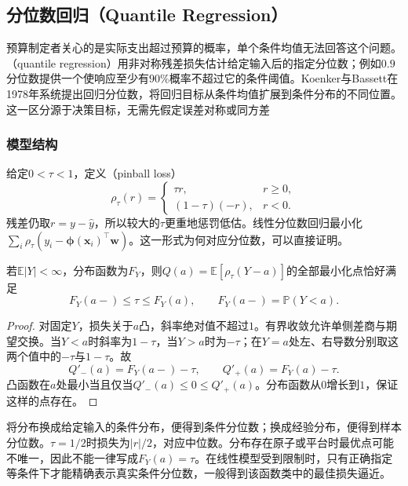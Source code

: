 \subsection{分位数回归（Quantile Regression）}
\label{sec:regression-quantiles}

预算制定者关心的是实际支出超过预算的概率，单个条件均值无法回答这个问题。（quantile regression）用非对称残差损失估计给定输入后的指定分位数；例如$0.9$分位数提供一个使响应至少有$90\%$概率不超过它的条件阈值。Koenker与Bassett在1978年系统提出回归分位数，将回归目标从条件均值扩展到条件分布的不同位置。这一区分源于决策目标，无需先假定误差对称或同方差

\subsubsection{模型结构}

给定$0<\tau<1$，定义（pinball loss）
\begin{equation}
  \rho_\tau(r)=
  \begin{cases}
    \tau r,&r\geq0,\\
    (1-\tau)(-r),&r<0.
  \end{cases}
  \label{eq:regression-pinball}
\end{equation}
残差仍取$r=y-\widehat y$，所以较大的$\tau$更重地惩罚低估。线性分位数回归最小化$\sum_i\rho_\tau(y_i-\bm{\phi}(\bm{x}_i)^{\top}\bm{w})$。这一形式为何对应分位数，可以直接证明。

\begin{theorem}[分位数损失的总体最优解]
  \label{thm:regression-quantile}
  若$\mathbb{E}|Y|<\infty$，分布函数为$F_Y$，则$Q(a)=\mathbb{E}[\rho_\tau(Y-a)]$的全部最小化点恰好满足
  \[
    F_Y(a-)\leq\tau\leq F_Y(a),
    \qquad F_Y(a-)=\mathbb{P}(Y<a).
  \]
\end{theorem}

\begin{proof}
对固定$Y$，损失关于$a$凸，斜率绝对值不超过$1$。有界收敛允许单侧差商与期望交换。当$Y<a$时斜率为$1-\tau$，当$Y>a$时为$-\tau$；在$Y=a$处左、右导数分别取这两个值中的$-\tau$与$1-\tau$。故
\[
  Q'_-(a)=F_Y(a-)-\tau,\qquad Q'_+(a)=F_Y(a)-\tau.
\]
凸函数在$a$处最小当且仅当$Q'_-(a)\leq0\leq Q'_+(a)$。分布函数从$0$增长到$1$，保证这样的点存在。
\end{proof}

将分布换成给定输入的条件分布，便得到条件分位数；换成经验分布，便得到样本分位数。$\tau=1/2$时损失为$|r|/2$，对应中位数。分布存在原子或平台时最优点可能不唯一，因此不能一律写成$F_Y(a)=\tau$。在线性模型受到限制时，只有正确指定等条件下才能精确表示真实条件分位数，一般得到该函数类中的最佳损失逼近。

